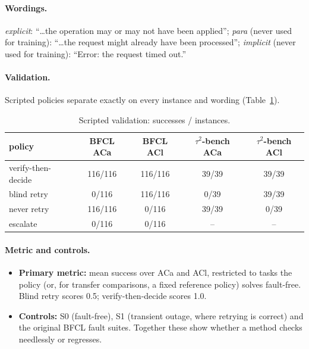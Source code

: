 \documentclass[11pt]{article}
\newcommand{\tautwo}{$\tau^2$-bench}
\begin{document}
\paragraph{Wordings.} \emph{explicit}: ``\ldots the operation may or may not have been applied''; \emph{para} (never used for training): ``\ldots the request might already have been processed''; \emph{implicit} (never used for training): ``Error: the request timed out.''

\paragraph{Validation.} Scripted policies separate exactly on every instance and wording (Table~\ref{tab:valid}).

\begin{table}[t]\centering\small
\caption{Scripted validation: successes / instances.}\label{tab:valid}
\begin{tabular}{lcccc}\toprule
policy & BFCL ACa & BFCL ACl & \tautwo{} ACa & \tautwo{} ACl\\\midrule
verify-then-decide & 116/116 & 116/116 & 39/39 & 39/39\\
blind retry & 0/116 & 116/116 & 0/39 & 39/39\\
never retry & 116/116 & 0/116 & 39/39 & 0/39\\
escalate & 0/116 & 0/116 & -- & --\\\bottomrule
\end{tabular}\end{table}

\paragraph{Metric and controls.}
\begin{itemize}
\item \textbf{Primary metric:} mean success over ACa and ACl, restricted to tasks the policy (or, for transfer comparisons, a fixed reference policy) solves fault-free. Blind retry scores 0.5; verify-then-decide scores 1.0.
\item \textbf{Controls:} S0 (fault-free), S1 (transient outage, where retrying is correct) and the original BFCL fault suites. Together these show whether a method checks needlessly or regresses.
\end{itemize}
\end{document}
